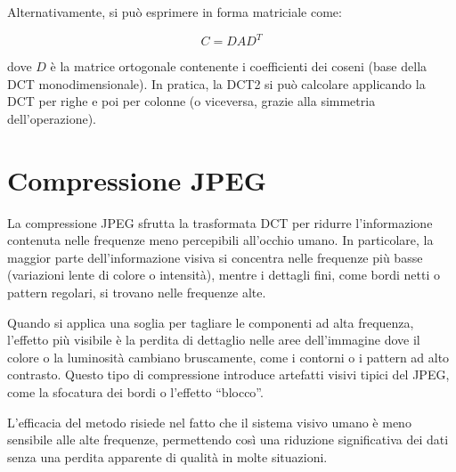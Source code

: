 Alternativamente, si può esprimere in forma matriciale come:

\[
C = D A D^T
\]

dove $D$ è la matrice ortogonale contenente i coefficienti dei coseni (base della DCT monodimensionale). In pratica, la DCT2 si può calcolare applicando la DCT per righe e poi per colonne (o viceversa, grazie alla simmetria dell’operazione).


\section*{Compressione JPEG}
La compressione JPEG sfrutta la trasformata DCT per ridurre l’informazione contenuta nelle frequenze meno percepibili all’occhio umano. In particolare, la maggior parte dell’informazione visiva si concentra nelle frequenze più basse (variazioni lente di colore o intensità), mentre i dettagli fini, come bordi netti o pattern regolari, si trovano nelle frequenze alte.

Quando si applica una soglia per tagliare le componenti ad alta frequenza, l’effetto più visibile è la perdita di dettaglio nelle aree dell’immagine dove il colore o la luminosità cambiano bruscamente, come i contorni o i pattern ad alto contrasto. Questo tipo di compressione introduce artefatti visivi tipici del JPEG, come la sfocatura dei bordi o l’effetto “blocco”.

L’efficacia del metodo risiede nel fatto che il sistema visivo umano è meno sensibile alle alte frequenze, permettendo così una riduzione significativa dei dati senza una perdita apparente di qualità in molte situazioni.

